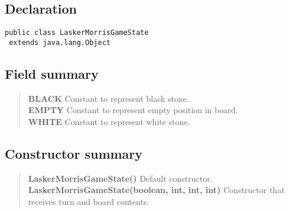 \documentclass[11pt,a4paper]{report}
\begin{document}
{{{{{{{{{\subsection{Declaration}{
\begin{lstlisting}[frame=none]
public class LaskerMorrisGameState
 extends java.lang.Object\end{lstlisting}
\subsection{Field summary}{
\begin{verse}
{\bf BLACK} Constant to represent black stone.\\
{\bf EMPTY} Constant to represent empty position in board.\\
{\bf WHITE} Constant to represent white stone.\\
\end{verse}
}
\subsection{Constructor summary}{
\begin{verse}
{\bf LaskerMorrisGameState()} Default constructor.\\
{\bf LaskerMorrisGameState(boolean, int\lbrack \rbrack , int, int)} Constructor that receives turn and board contents.\\
\end{verse}
}
}}}}}}}}}}
\end{document}

